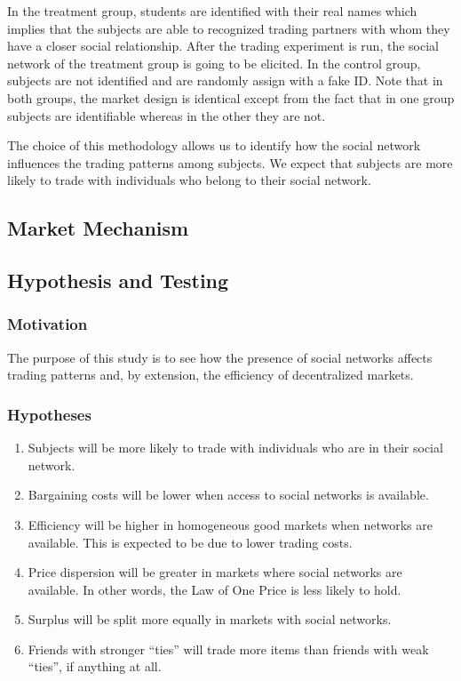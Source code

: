 \documentclass{article}
\begin{document}
In the treatment group, students are identified with their real names which
implies that the subjects are able to recognized trading partners with whom they
have a closer social relationship. After the trading experiment is run, the
social network of the treatment group is going to be elicited. In the control
group, subjects are not identified and are randomly assign with a fake ID. Note
that in both groups, the market design is identical except from the fact that in
one group subjects are identifiable whereas in the other they are not.

The choice of this methodology allows us to identify how the social network
influences the trading patterns among subjects. We expect that subjects are more
likely to trade with individuals who belong to their social network.

\subsection{Market Mechanism}


\subsection{Hypothesis and Testing}
\subsubsection{Motivation}

The purpose of this study is to see how the presence of social networks affects trading patterns and, by extension, the efficiency of decentralized markets.

\subsubsection{Hypotheses}

\begin{enumerate}[{Hypothesis} 1]
    \item Subjects will be more likely to trade with individuals who are in
        their social network.

    \item Bargaining costs will be lower when access to social networks is
        available.

    \item Efficiency will be higher in homogeneous good markets when networks
        are available. This is expected to be due to lower trading costs.

    \item Price dispersion will be greater in markets where social networks are
        available. In other words, the Law of One Price is less likely to hold.

    \item Surplus will be split more equally in markets with social networks.

    \item Friends with stronger ``ties'' will trade more items than friends with
        weak ``ties'', if anything at all.
\end{enumerate}
\end{document}
